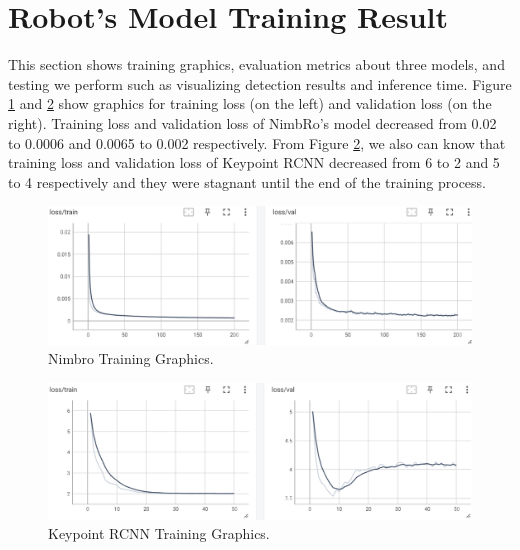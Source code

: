\section{Robot's Model Training Result}
\label{sec:robotmodeltrainingresult}

This section shows training graphics, evaluation metrics about three models, and testing we perform such as visualizing detection results and inference time.
Figure \ref{fig:nimbro-training-graphics} and \ref{fig:rcnn-training-graphics} show graphics for training loss (on the left) and validation loss (on the right).
Training loss and validation loss of NimbRo's model decreased from 0.02 to 0.0006 and 0.0065 to 0.002 respectively. From Figure \ref{fig:rcnn-training-graphics},
we also can know that training loss and validation loss of Keypoint RCNN decreased from 6 to 2 and 5 to 4 respectively and they were stagnant until the end of the training process.
\begin{figure}[ht]
  \centering
  \includegraphics[scale=0.65]{gambar/loss-nimbro.png}
  \caption{Nimbro Training Graphics.}
  \label{fig:nimbro-training-graphics}
\end{figure}
\begin{figure}[ht]
  \centering
  \includegraphics[scale=0.65]{gambar/loss-rcnn.png}
  \caption{Keypoint RCNN Training Graphics.}
  \label{fig:rcnn-training-graphics}
\end{figure}


